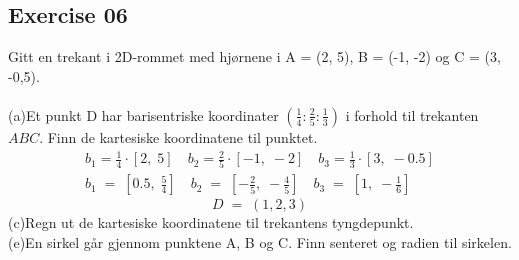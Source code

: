 \documentclass[12pt, a4paper]{article}
\begin{document}
\subsection*{Exercise 06}
Gitt en trekant i 2D-rommet med hjørnene i A = (2, 5),
	B = (-1, -2) og C = (3, -0,5).\\\\
	(a)\quad Et punkt D har barisentriske koordinater $
	\left(\frac{1}{4}:\frac{2}{5}:\frac{1}{3}\right)
	$ i forhold til trekanten $ABC$. Finn de kartesiske 
	koordinatene til punktet.
			\begin{gather}
				\tag*{}
					b_1=\frac{1}{4}\cdot[2,\;5]\quad
					b_2=\frac{2}{5}\cdot[-1,\;-2]\quad
					b_3=\frac{1}{3}\cdot[3,\;-0.5]\\
				\tag*{}
					b_1\;=\;\left[
						0.5,\;\frac{5}{4}
					\right]\quad
					b_2\;=\;\left[
						-\frac{2}{5},\;-\frac{4}{5}
					\right]\quad
					b_3\;=\;\left[
						1,\;-\frac{1}{6}
					\right]
			\end{gather}
			\begin{equation}
				\tag*{}
					D\;=\;\left(
						1, 2, 3
					\right)
			\end{equation}
	(c)\quad Regn ut de kartesiske koordinatene til trekantens
	tyngdepunkt.
			\begin{equation}
				\tag*{}
			\end{equation}
	(e)\quad En sirkel går gjennom punktene A, B og C.
	Finn senteret og radien til sirkelen.
			\begin{equation}
				\tag*{}
			\end{equation}
\end{document}
